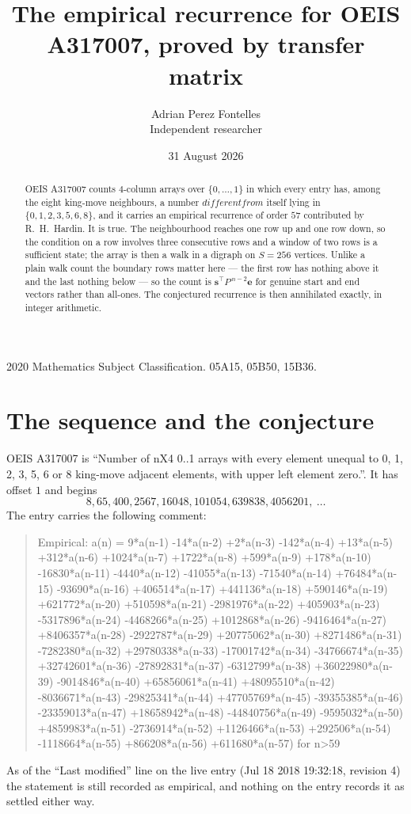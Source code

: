 \documentclass[11pt,a4paper]{article}
\title{The empirical recurrence for OEIS A317007, proved by transfer matrix}
\author{Adrian Perez Fontelles\\ \small Independent researcher}
\date{31 August 2026}
\theoremstyle{plain}
\theoremstyle{definition}
\begin{document}
\maketitle

\begin{abstract}
OEIS A317007 counts $4$-column arrays over $\{0,\dots,1\}$ in which every entry has,
among the eight king-move neighbours, a number $different from$ itself lying in $\{0,1,2,3,5,6,8\}$, and it carries an empirical
recurrence of order $57$ contributed by R.~H.~Hardin. It is true. The neighbourhood
reaches one row up and one row down, so the condition on a row involves three consecutive
rows and a window of two rows is a sufficient state; the array is then a walk in a digraph
on $S=256$ vertices. Unlike a plain walk count the boundary rows matter here --- the first
row has nothing above it and the last nothing below --- so the count is
$\mathbf{s}^{\!\top}P^{\,n-2}\mathbf{e}$ for genuine start and end vectors rather than
all-ones. The conjectured recurrence is then annihilated exactly, in integer arithmetic.
\end{abstract}

\noindent\small 2020 Mathematics Subject Classification. 05A15, 05B50, 15B36.\normalsize

\section{The sequence and the conjecture}

OEIS A317007 is ``Number of nX4 0..1 arrays with every element unequal to 0, 1, 2, 3, 5, 6 or 8 king-move adjacent elements, with upper left element zero.''. It has offset
$1$ and begins
\[
8, 65, 400, 2567, 16048, 101054, 639838, 4056201,\ \dots
\]
The entry carries the following comment:
\begin{quote}\small
Empirical: a(n) = 9*a(n-1) -14*a(n-2) +2*a(n-3) -142*a(n-4) +13*a(n-5) +312*a(n-6) +1024*a(n-7) +1722*a(n-8) +599*a(n-9) +178*a(n-10) -16830*a(n-11) -4440*a(n-12) -41055*a(n-13) -71540*a(n-14) +76484*a(n-15) -93690*a(n-16) +406514*a(n-17) +441136*a(n-18) +590146*a(n-19) +621772*a(n-20) +510598*a(n-21) -2981976*a(n-22) +405903*a(n-23) -5317896*a(n-24) -4468266*a(n-25) +1012868*a(n-26) -9416464*a(n-27) +8406357*a(n-28) -2922787*a(n-29) +20775062*a(n-30) +8271486*a(n-31) -7282380*a(n-32) +29780338*a(n-33) -17001742*a(n-34) -34766674*a(n-35) +32742601*a(n-36) -27892831*a(n-37) -6312799*a(n-38) +36022980*a(n-39) -9014846*a(n-40) +65856061*a(n-41) +48095510*a(n-42) -8036671*a(n-43) -29825341*a(n-44) +47705769*a(n-45) -39355385*a(n-46) -23359013*a(n-47) +18658942*a(n-48) -44840756*a(n-49) -9595032*a(n-50) +4859983*a(n-51) -2736914*a(n-52) +1126466*a(n-53) +292506*a(n-54) -1118664*a(n-55) +866208*a(n-56) +611680*a(n-57) for n>59
\end{quote}
As of the ``Last modified'' line on the live entry (Jul 18 2018 19:32:18, revision
4) the statement is still recorded as empirical, and nothing on the entry
records it as settled either way.
\end{document}
